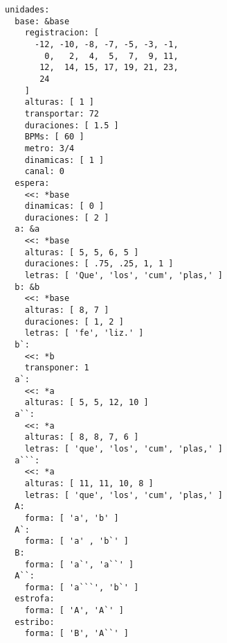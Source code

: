 \begin{itemize}
\begin{verbatim}
unidades: 
  base: &base 
    registracion: [ 
      -12, -10, -8, -7, -5, -3, -1,
        0,   2,  4,  5,  7,  9, 11,
       12,  14, 15, 17, 19, 21, 23,
       24
    ]
    alturas: [ 1 ] 
    transportar: 72 
    duraciones: [ 1.5 ]
    BPMs: [ 60 ]
    metro: 3/4
    dinamicas: [ 1 ]
    canal: 0
  espera:
    <<: *base
    dinamicas: [ 0 ] 
    duraciones: [ 2 ]
  a: &a 
    <<: *base
    alturas: [ 5, 5, 6, 5 ] 
    duraciones: [ .75, .25, 1, 1 ]
    letras: [ 'Que', 'los', 'cum', 'plas,' ]
  b: &b 
    <<: *base
    alturas: [ 8, 7 ] 
    duraciones: [ 1, 2 ]
    letras: [ 'fe', 'liz.' ]
  b`: 
    <<: *b
    transponer: 1
  a`: 
    <<: *a
    alturas: [ 5, 5, 12, 10 ] 
  a``: 
    <<: *a
    alturas: [ 8, 8, 7, 6 ] 
    letras: [ 'que', 'los', 'cum', 'plas,' ]
  a```: 
    <<: *a
    alturas: [ 11, 11, 10, 8 ] 
    letras: [ 'que', 'los', 'cum', 'plas,' ]
  A: 
    forma: [ 'a', 'b' ] 
  A`: 
    forma: [ 'a' , 'b`' ]
  B: 
    forma: [ 'a`', 'a``' ] 
  A``: 
    forma: [ 'a```', 'b`' ] 
  estrofa: 
    forma: [ 'A', 'A`' ]
  estribo: 
    forma: [ 'B', 'A``' ]

\end{verbatim}


\end{itemize}
\setlength{\parskip}{6pt plus 2pt minus 1pt}